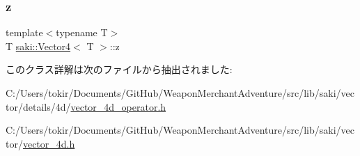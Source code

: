 \subsubsection{\texorpdfstring{z}{z}}
{\footnotesize\ttfamily template$<$typename T$>$ \\
T \mbox{\hyperlink{classsaki_1_1_vector4}{saki\+::\+Vector4}}$<$ T $>$\+::z}



このクラス詳解は次のファイルから抽出されました\+:\begin{DoxyCompactItemize}
\item 
C\+:/\+Users/tokir/\+Documents/\+Git\+Hub/\+Weapon\+Merchant\+Adventure/src/lib/saki/vector/details/4d/\mbox{\hyperlink{vector__4d__operator_8h}{vector\+\_\+4d\+\_\+operator.\+h}}\item 
C\+:/\+Users/tokir/\+Documents/\+Git\+Hub/\+Weapon\+Merchant\+Adventure/src/lib/saki/vector/\mbox{\hyperlink{vector__4d_8h}{vector\+\_\+4d.\+h}}\end{DoxyCompactItemize}
